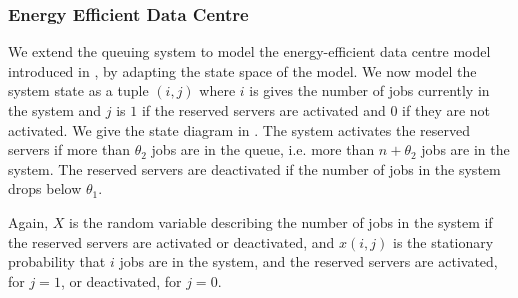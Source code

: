 \subsubsection*{Energy Efficient Data Centre}\label{sec:cloud:data_centers:modeling:energy_efficient}

We extend the queuing system to model the energy-efficient data centre model introduced in , by adapting the state space of the model.
We now model the system state as a tuple \((i,j)\) where \(i\) is gives the number of jobs currently in the system and \(j\) is \(1\) if the reserved servers are activated and \(0\) if they are not activated.
We give the state diagram in .
The system activates the reserved servers if more than \(\theta_2\) jobs are in the queue, i.e. more than \(n + \theta_2\) jobs are in the system.
The reserved servers are deactivated if the number of jobs in the system drops below \(\theta_1\).

Again, \(X\) is the random variable describing the number of jobs in the system if the reserved servers are activated or deactivated, and \(x(i, j)\) is the stationary probability that \(i\) jobs are in the system, and the reserved servers are activated, for \(j=1\), or deactivated, for \(j=0\). 


